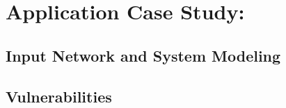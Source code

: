 

\section{Application Case Study:}\label{subsec:approach:main}





\subsection{Input Network and System Modeling}\label{subsec:approach:model}


% 

\subsection{Vulnerabilities}\label{subsec:approach:vulns}

